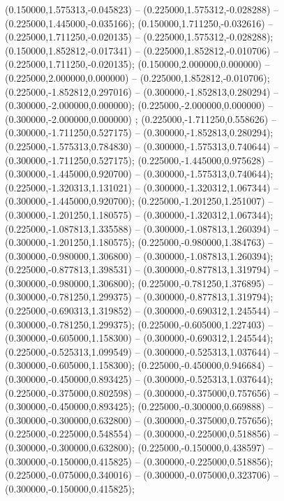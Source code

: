  (0.150000,1.575313,-0.045823) -- (0.225000,1.575312,-0.028288) -- (0.225000,1.445000,-0.035166);
 (0.150000,1.711250,-0.032616) -- (0.225000,1.711250,-0.020135) -- (0.225000,1.575312,-0.028288);
 (0.150000,1.852812,-0.017341) -- (0.225000,1.852812,-0.010706) -- (0.225000,1.711250,-0.020135);
 (0.150000,2.000000,0.000000) -- (0.225000,2.000000,0.000000) -- (0.225000,1.852812,-0.010706);
 (0.225000,-1.852812,0.297016) -- (0.300000,-1.852813,0.280294) -- (0.300000,-2.000000,0.000000);
 (0.225000,-2.000000,0.000000) -- (0.300000,-2.000000,0.000000) ;
 (0.225000,-1.711250,0.558626) -- (0.300000,-1.711250,0.527175) -- (0.300000,-1.852813,0.280294);
 (0.225000,-1.575313,0.784830) -- (0.300000,-1.575313,0.740644) -- (0.300000,-1.711250,0.527175);
 (0.225000,-1.445000,0.975628) -- (0.300000,-1.445000,0.920700) -- (0.300000,-1.575313,0.740644);
 (0.225000,-1.320313,1.131021) -- (0.300000,-1.320312,1.067344) -- (0.300000,-1.445000,0.920700);
 (0.225000,-1.201250,1.251007) -- (0.300000,-1.201250,1.180575) -- (0.300000,-1.320312,1.067344);
 (0.225000,-1.087813,1.335588) -- (0.300000,-1.087813,1.260394) -- (0.300000,-1.201250,1.180575);
 (0.225000,-0.980000,1.384763) -- (0.300000,-0.980000,1.306800) -- (0.300000,-1.087813,1.260394);
 (0.225000,-0.877813,1.398531) -- (0.300000,-0.877813,1.319794) -- (0.300000,-0.980000,1.306800);
 (0.225000,-0.781250,1.376895) -- (0.300000,-0.781250,1.299375) -- (0.300000,-0.877813,1.319794);
 (0.225000,-0.690313,1.319852) -- (0.300000,-0.690312,1.245544) -- (0.300000,-0.781250,1.299375);
 (0.225000,-0.605000,1.227403) -- (0.300000,-0.605000,1.158300) -- (0.300000,-0.690312,1.245544);
 (0.225000,-0.525313,1.099549) -- (0.300000,-0.525313,1.037644) -- (0.300000,-0.605000,1.158300);
 (0.225000,-0.450000,0.946684) -- (0.300000,-0.450000,0.893425) -- (0.300000,-0.525313,1.037644);
 (0.225000,-0.375000,0.802598) -- (0.300000,-0.375000,0.757656) -- (0.300000,-0.450000,0.893425);
 (0.225000,-0.300000,0.669888) -- (0.300000,-0.300000,0.632800) -- (0.300000,-0.375000,0.757656);
 (0.225000,-0.225000,0.548554) -- (0.300000,-0.225000,0.518856) -- (0.300000,-0.300000,0.632800);
 (0.225000,-0.150000,0.438597) -- (0.300000,-0.150000,0.415825) -- (0.300000,-0.225000,0.518856);
 (0.225000,-0.075000,0.340016) -- (0.300000,-0.075000,0.323706) -- (0.300000,-0.150000,0.415825);
